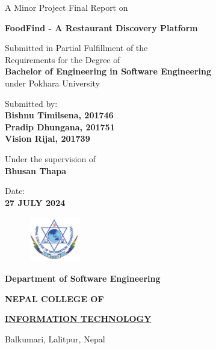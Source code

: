 \documentclass[12pt, a4paper]{report}
\begin{document}
\begin{titlepage}
	\begin{center}
	
	\large%
	A Minor Project Final Report on
	
	\huge %
	\textbf{FoodFind - A Restaurant Discovery Platform}

	\vfill
	
	\large %
	Submitted in Partial Fulfillment of the \\ 
	Requirements for the Degree of \\ 
	\textbf {Bachelor of Engineering in Software Engineering} \\
	under Pokhara University
	
	\vfill
	
	Submitted by: \\ 
	\textbf {Bishnu Timilsena, 201746} \\
        \textbf {Pradip Dhungana, 201751} \\
        \textbf {Vision Rijal, 201739} \\
	
	\vfill

    \vfill
 
	Under the supervision of \\ 
	\textbf {Bhusan Thapa} \\
	
	\vfill
	
	\vfill
	
	Date: \\
	\textbf {27 JULY 2024}
	
	\vfill
	
	\end{center}
	
	\begin{figure}
	\centering
	\includegraphics[width=0.2\textwidth]{college-logo}
	\end{figure}
	
	\selectfont
	
	\textbf {Department of Software Engineering}  
	
	\Large %
	\textbf {NEPAL COLLEGE OF} 
	
	\LARGE %
	\textbf {\underline {INFORMATION TECHNOLOGY} }
	
	\small %
	Balkumari, Lalitpur, Nepal
	
	
\end{titlepage}
\end{document}
